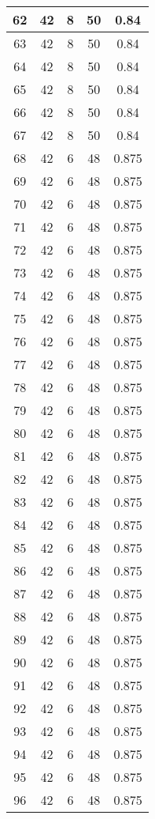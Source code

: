 \documentclass[letterpaper, 12pt]{article}
\begin{document}
\begin{longtable}{|c|c|c|c|c|}
\hline
62 & 42 & 8 & 50 & 0.84 \\
\hline
63 & 42 & 8 & 50 & 0.84 \\
\hline
64 & 42 & 8 & 50 & 0.84 \\
\hline
65 & 42 & 8 & 50 & 0.84 \\
\hline
66 & 42 & 8 & 50 & 0.84 \\
\hline
67 & 42 & 8 & 50 & 0.84 \\
\hline
68 & 42 & 6 & 48 & 0.875 \\
\hline
69 & 42 & 6 & 48 & 0.875 \\
\hline
70 & 42 & 6 & 48 & 0.875 \\
\hline
71 & 42 & 6 & 48 & 0.875 \\
\hline
72 & 42 & 6 & 48 & 0.875 \\
\hline
73 & 42 & 6 & 48 & 0.875 \\
\hline
74 & 42 & 6 & 48 & 0.875 \\
\hline
75 & 42 & 6 & 48 & 0.875 \\
\hline
76 & 42 & 6 & 48 & 0.875 \\
\hline
77 & 42 & 6 & 48 & 0.875 \\
\hline
78 & 42 & 6 & 48 & 0.875 \\
\hline
79 & 42 & 6 & 48 & 0.875 \\
\hline
80 & 42 & 6 & 48 & 0.875 \\
\hline
81 & 42 & 6 & 48 & 0.875 \\
\hline
82 & 42 & 6 & 48 & 0.875 \\
\hline
83 & 42 & 6 & 48 & 0.875 \\
\hline
84 & 42 & 6 & 48 & 0.875 \\
\hline
85 & 42 & 6 & 48 & 0.875 \\
\hline
86 & 42 & 6 & 48 & 0.875 \\
\hline
87 & 42 & 6 & 48 & 0.875 \\
\hline
88 & 42 & 6 & 48 & 0.875 \\
\hline
89 & 42 & 6 & 48 & 0.875 \\
\hline
90 & 42 & 6 & 48 & 0.875 \\
\hline
91 & 42 & 6 & 48 & 0.875 \\
\hline
92 & 42 & 6 & 48 & 0.875 \\
\hline
93 & 42 & 6 & 48 & 0.875 \\
\hline
94 & 42 & 6 & 48 & 0.875 \\
\hline
95 & 42 & 6 & 48 & 0.875 \\
\hline
96 & 42 & 6 & 48 & 0.875 \\

\end{longtable}
\end{document}
